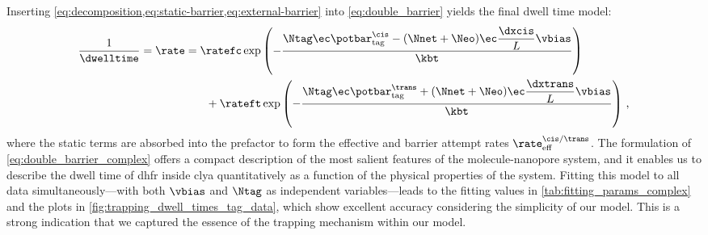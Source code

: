 Inserting \cref{eq:decomposition,eq:static-barrier,eq:external-barrier} into \cref{eq:double_barrier} yields
the final dwell time model:
%
\begin{equation}\label{eq:double_barrier_complex}
	\begin{split}
    \frac{1}{\dwelltime} = \rate ={}&
	\ratefc \exp{%
		\left(
			-\dfrac{%
				\Ntag \ec \potbar_{\rm{tag}}^{\cis}
				- (\Nnet + \Neo) \ec \dfrac{\dxcis}{L} \vbias}{\kbt}
		\right)
		} \\
	&\enspace +
	\rateft \exp{%
		\left(
			-\dfrac{%
				\Ntag \ec \potbar_{\rm{tag}}^{\trans}
				+ (\Nnet + \Neo) \ec \dfrac{\dxtrans}{L} \vbias}{\kbt}
		\right)
    }
    \text{ ,}
	\end{split}
\end{equation}
%
where the static terms are absorbed into the prefactor to form the effective \cisi{} and \transi{} barrier
attempt rates $\rate_{\rm{eff}}^{\cis/\trans}$. The formulation of \cref{eq:double_barrier_complex} offers a
compact description of the most salient features of the molecule-nanopore system, and it enables us to
describe the dwell time of \gls{dhfr} inside \gls{clya} quantitatively as a function of the physical
properties of the system. Fitting this model to all  data simultaneously---with both
$\vbias$ and $\Ntag$ as independent variables---leads to the fitting values in
\cref{tab:fitting_params_complex} and the plots in \cref{fig:trapping_dwell_times_tag_data}, which show
excellent accuracy considering the simplicity of our model. This is a strong indication that we captured the
essence of the trapping mechanism within our model.


